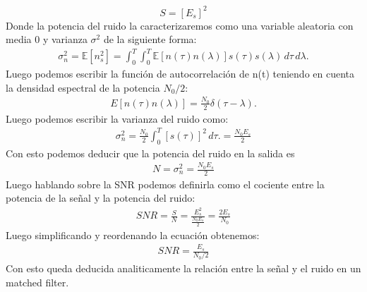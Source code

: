 \documentclass[
  11pt,
  letterpaper,
  answers
]{exam}
\begin{document}
\begin{questions}
\begin{solution}
  \begin{equation}
    S = [E_s]^2
  \end{equation}
  Donde la potencia del ruido la caracterizaremos como una variable aleatoria con media 0 y varianza $\sigma^2$ de la siguiente forma:
  \begin{align}
    \sigma_n^2 = \mathbb{E}[n_s^2] = \int_0^T \int_0^T \mathbb{E}[n(\tau) n(\lambda)] s(\tau) s(\lambda) \, d\tau \, d\lambda.
  \end{align}
  Luego podemos escribir la función de autocorrelación de n(t) teniendo en cuenta la densidad espectral de la potencia $N_0/2$:
  \begin{align}
    E[n(\tau)n(\lambda)] = \frac{N_0}{2} \delta(\tau-\lambda).
    \end{align}
  Luego podemos escribir la varianza del ruido como:
  \begin{align}
    \sigma_n^2 = \frac{N_0}{2} \int_0^T [s(\tau)]^2 \, d\tau. = \frac{N_0 E_s}{2}
  \end{align}
Con esto podemos deducir que la potencia del ruido en la salida es 
\begin{align}
  N = \sigma_n^2 = \frac{N_0 E_s}{2}
\end{align}
Luego hablando sobre la SNR podemos definirla como el cociente entre la potencia de la señal y la potencia del ruido:
\begin{align}
  SNR = \frac{S}{N} = \frac{E_s^2}{\frac{N_0 E_s}{2}} = \frac{2E_s}{N_0}
\end{align}
Luego simplificando  y reordenando la ecuación obtenemos:
\begin{align}
  SNR = \frac{E_s}{N_{0}/2}
\end{align}
Con esto queda deducida analiticamente la relación entre la señal y el ruido en un matched filter.

\end{solution}


\end{questions}
\end{document}
